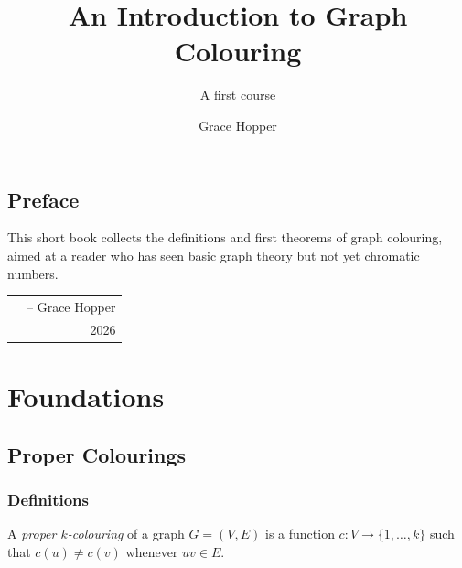 \documentclass[lang=en,12pt]{beautybook}
\begin{document}
\thispagestyle{empty}
\title{An Introduction to Graph Colouring}
\subtitle{A first course}
\bookseries{}
\author{Grace Hopper}
\makecover

\makeatletter
{}
\oddoutermargin{\sffamily \leftmark}
\evenoutermargin{\sffamily\@title}
\makeatother


\frontmatter
{}

{\thispagestyle{empty}
\chapter*{Preface}
This short book collects the definitions and first theorems of graph
colouring, aimed at a reader who has seen basic graph theory but not yet
chromatic numbers.

\hfill
\begin{tabular}{lr}
    &-- Grace Hopper\\
    & 2026
\end{tabular}
\clearpage}

\thispagestyle{empty}
\tableofcontents\let\cleardoublepage\clearpage

\mainmatter
{}

\part{Foundations}

\chapter{Proper Colourings}
\label{ch:colourings}

\section{Definitions}

\begin{defi}
\label{def:colouring}
A \emph{proper $k$-colouring} of a graph $G = (V, E)$ is a function
$c \colon V \to \{1, \dots, k\}$ such that $c(u) \neq c(v)$ whenever
$uv \in E$.
\end{defi}
\end{document}
